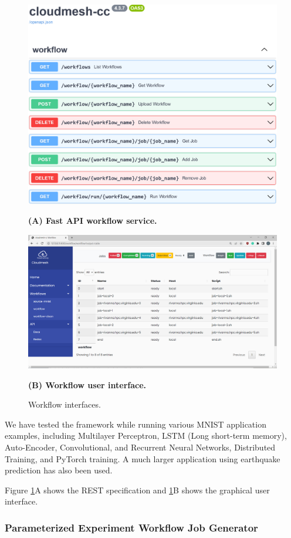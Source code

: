 \documentclass[utf8]{FrontiersinVancouver} %
\begin{document}
\begin{figure}[htb]
  \centering\includegraphics[width=0.8\columnwidth]{images/fastapi-service-highres.jpg}
  
  {\bf (A) Fast API workflow service.}

  \bigskip


    \centering\includegraphics[width=0.8\columnwidth]{images/cc-1.jpg}

    {\bf (B) Workflow user interface.}

    \caption{Workflow interfaces.}
    \label{fig:cc-3}
\end{figure}


We have tested the framework while running various MNIST application examples, including Multilayer Perceptron, LSTM (Long short-term memory), Auto-Encoder, Convolutional, and Recurrent Neural Networks, Distributed Training, and PyTorch training.  A much larger application using earthquake prediction has also been used.

Figure \ref{fig:cc-3}A shows the REST specification and \ref{fig:cc-3}B shows the graphical user interface.

\subsubsection{Parameterized Experiment Workflow Job Generator}
\label{sec:workflow-sbatch}
\end{document}
